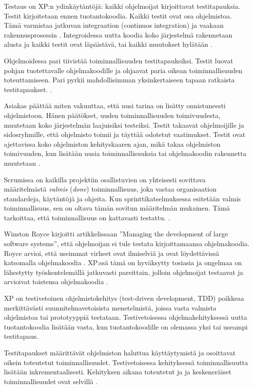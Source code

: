 \documentclass[finnish]{tktltiki2}
\theoremstyle{definition}
\theoremstyle{remark}
\begin{document}
Testaus on XP:n ydinkäytäntöjä: kaikki ohjelmoijat kirjoittavat testitapauksia. Testit kirjoitetaan ennen tuotantokoodia. Kaikki testit ovat osa ohjelmistoa. Tämä varmistaa jatkuvan integraation (continuos integration) ja vaakaan rakennusprosessin \cite{FOW01a}. Integroidessa uutta koodia koko järjestelmä rakennetaan alusta ja kaikki testit ovat läpäistävä, tai kaikki muutokset hylätään \cite{BEC99}.

Ohjelmoidessa pari tiivistää toiminnallisuuden testitapauksiksi. Testit luovat pohjan tuotettavalle ohjelmakoodille ja ohjaavat paria oikean toiminnallisuuden toteuttamiseen. Pari pyrkii mahdollisimman yksinkertaiseen tapaan ratkaista testitapaukset. \cite{BEC99}.

Asiakas päättää miten vakuuttaa, että uusi tarina on lisätty onnistuneesti ohjelmistoon. Hänen päätökset, uuden toiminnallisuuden toimivuudesta, muutetaan koko järjestelmän laajuisiksi testeiksi. Testit takaavat ohjelmoijille ja sidosryhmille, että ohjelmisto toimii ja täyttää odotetut vaatimukset. Testit ovat ajettavissa koko ohjelmiston kehityskaaren ajan, mikä takaa ohjelmiston toimivuuden, kun lisätään uusia toiminnallisuuksia tai ohjelmakoodin rakennetta muutetaan \cite{BEC99}.

Scrumissa on kaikilla projektiin osallistuvien on yhteisesti sovittava määritelmästä \textit{valmis} (\textit{done}) toiminnallisuus, joka vastaa organisaation standardeja, käytäntöjä ja ohjeita. Kun sprinttikatselmuksessa esitetään valmis toiminnallisuus, sen on oltava tämän sovitun määritelmän mukainen. Tämä tarkoittaa, että toiminnallisuus on kattavasti testattu. \cite{SCH09}.

Winston Royce kirjoitti artikkelissaan ''Managing the development of large software systems'', että ohjelmoijan ei tule testata kirjoittamaansa ohjelmakoodia. Royce arvioi, että useimmat virheet ovat ilmiselviä ja ovat löydettävissä katsomalla ohjelmakoodia \cite{ROY70}. XP:ssä tämä on hyväksytty tosiasia ja ongelmaa on lähestytty työskentelemällä jatkuvasti pareittain, jolloin ohjelmoijat testaavat ja arvioivat toistensa ohjelmakoodia  \cite{BEC99}.

XP on testivetoinen ohjelmistokehitys (test-driven development, TDD) poikkeaa merkittävästi suunnitelmavetoisista menetelmistä, joissa vasta valmista ohjelmistoa tai prototyyppiä testataan. Testivetoisessa ohjelmakehityksessä uutta tuotantokoodia lisätään vasta, kun tuotantokoodille on olemassa yksi tai useampi testitapaus.

Testitapaukset määrittävät ohjelmiston haluttua käyttäytymistä ja osoittavat oikein toteutetut toiminnallisuudet. Testivetoisessa kehityksessä toiminnallisuutta lisätään inkrementaalisesti. Kehityksen aikana toteutetut ja ja keskeneräiset toiminnallisuudet ovat selvillä \cite{EDW03}. 
\end{document}
